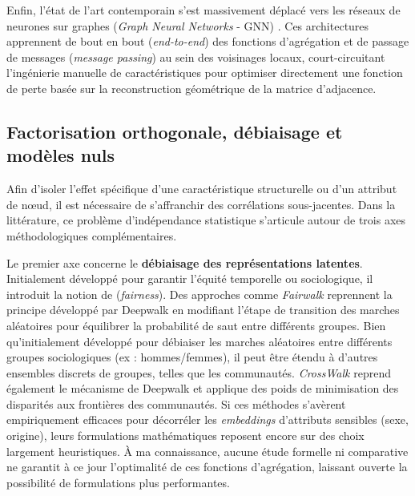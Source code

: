 Enfin, l'état de l'art contemporain s'est massivement déplacé vers les réseaux de neurones sur graphes (\textit{Graph Neural Networks} - GNN) \cite{kipf2016semi}. Ces architectures apprennent de bout en bout (\textit{end-to-end}) des fonctions d'agrégation et de passage de messages (\textit{message passing}) au sein des voisinages locaux, court-circuitant l'ingénierie manuelle de caractéristiques pour optimiser directement une fonction de perte basée sur la reconstruction géométrique de la matrice d'adjacence.


\subsection{Factorisation orthogonale, débiaisage et modèles nuls}
\label{sec:decorrelation}

Afin d'isoler l'effet spécifique d'une caractéristique structurelle ou d'un attribut de nœud, il est nécessaire de s'affranchir des corrélations sous-jacentes. Dans la littérature, ce problème d'indépendance statistique s'articule autour de trois axes méthodologiques complémentaires.

Le premier axe concerne le \textbf{débiaisage des représentations latentes}. Initialement développé pour garantir l'équité temporelle ou sociologique, il introduit la notion de (\textit{fairness}). Des approches comme \textit{Fairwalk} \cite{rahman2019fairwalk} reprennent la principe développé par Deepwalk en modifiant l'étape de transition des marches aléatoires pour équilibrer la probabilité de saut entre différents groupes. Bien qu'initialement développé pour débiaiser les marches aléatoires entre différents groupes sociologiques (ex : hommes/femmes), il peut être étendu à d'autres ensembles discrets de groupes, telles que les communautés. \textit{CrossWalk} \cite{khajehnejad2022crosswalk} reprend également le mécanisme de Deepwalk et applique des poids de minimisation des disparités aux frontières des communautés. Si ces méthodes s'avèrent empiriquement efficaces pour décorréler les \textit{embeddings} d'attributs sensibles (sexe, origine), leurs formulations mathématiques reposent encore 
sur des choix largement heuristiques. À ma connaissance, aucune étude formelle ni comparative ne garantit à ce jour l'optimalité de ces fonctions d'agrégation, laissant ouverte la possibilité de formulations plus performantes.

